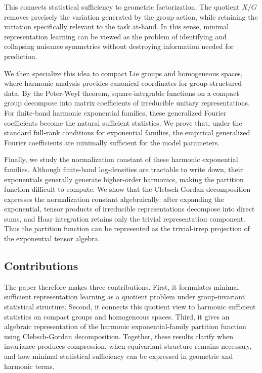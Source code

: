 \documentclass{ssl}
\begin{document}
This connects statistical sufficiency to geometric factorization. The quotient $X/G$ removes precisely the variation generated by the group action, while retaining the variation specifically relevant to the task at-hand. In this sense, minimal representation learning can be viewed as the problem of identifying and collapsing nuisance symmetries without destroying information needed for prediction.

We then specialize this idea to compact Lie groups and homogeneous spaces, where harmonic analysis provides canonical coordinates for group-structured data. By the Peter-Weyl theorem, square-integrable functions on a compact group decompose into matrix coefficients of irreducible unitary representations. For finite-band harmonic exponential families, these generalized Fourier coefficients become the natural sufficient statistics. We prove that, under the standard full-rank conditions for exponential families, the empirical generalized Fourier coefficients are minimally sufficient for the model parameters.

Finally, we study the normalization constant of these harmonic exponential families. Although finite-band log-densities are tractable to write down, their exponentials generally generate higher-order harmonics, making the partition function difficult to compute. We show that the Clebsch-Gordan decomposition expresses the normalization constant algebraically: after expanding the exponential, tensor products of irreducible representations decompose into direct sums, and Haar integration retains only the trivial representation component. Thus the partition function can be represented as the trivial-irrep projection of the exponential tensor algebra.

\subsection{Contributions}
The paper therefore makes three contributions. First, it formulates minimal sufficient representation learning as a quotient problem under group-invariant statistical structure. Second, it connects this quotient view to harmonic sufficient statistics on compact groups and homogeneous spaces. Third, it gives an algebraic representation of the harmonic exponential-family partition function using Clebsch-Gordan decomposition. Together, these results clarify when invariance produces compression, when equivariant structure remains necessary, and how minimal statistical sufficiency can be expressed in geometric and harmonic terms.
\end{document}
